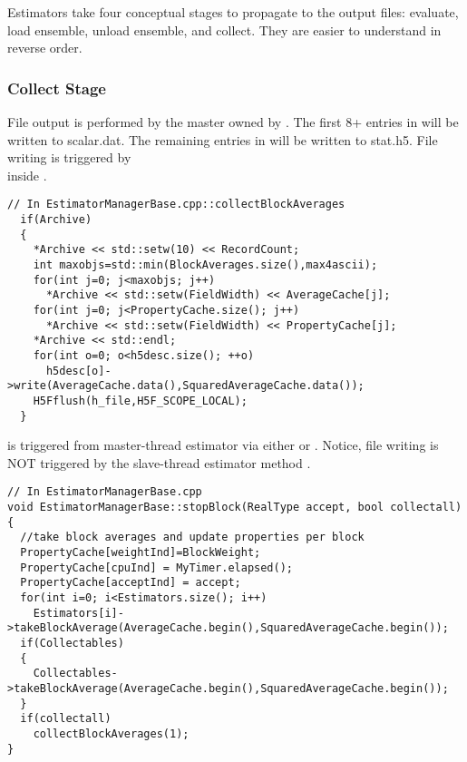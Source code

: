Estimators take four conceptual stages to propagate to the output files: evaluate, load ensemble, unload ensemble, and collect. They are easier to understand in reverse order.

\subsubsection{Collect Stage}
File output is performed by the master  owned by . The first 8+ entries in  will be written to scalar.dat. The remaining entries in  will be written to stat.h5. File writing is triggered by \\  inside .

\begin{lstlisting}
// In EstimatorManagerBase.cpp::collectBlockAverages
  if(Archive)
  {
    *Archive << std::setw(10) << RecordCount;
    int maxobjs=std::min(BlockAverages.size(),max4ascii);
    for(int j=0; j<maxobjs; j++)
      *Archive << std::setw(FieldWidth) << AverageCache[j];
    for(int j=0; j<PropertyCache.size(); j++)
      *Archive << std::setw(FieldWidth) << PropertyCache[j];
    *Archive << std::endl;
    for(int o=0; o<h5desc.size(); ++o)
      h5desc[o]->write(AverageCache.data(),SquaredAverageCache.data());
    H5Fflush(h_file,H5F_SCOPE_LOCAL);
  }
\end{lstlisting}

 is triggered from master-thread estimator via either  or . Notice, file writing is NOT triggered by the slave-thread estimator method .

\begin{lstlisting}
// In EstimatorManagerBase.cpp
void EstimatorManagerBase::stopBlock(RealType accept, bool collectall)
{
  //take block averages and update properties per block
  PropertyCache[weightInd]=BlockWeight;
  PropertyCache[cpuInd] = MyTimer.elapsed();
  PropertyCache[acceptInd] = accept;
  for(int i=0; i<Estimators.size(); i++)
    Estimators[i]->takeBlockAverage(AverageCache.begin(),SquaredAverageCache.begin());
  if(Collectables)
  { 
    Collectables->takeBlockAverage(AverageCache.begin(),SquaredAverageCache.begin());
  }
  if(collectall)
    collectBlockAverages(1);
}
\end{lstlisting}


